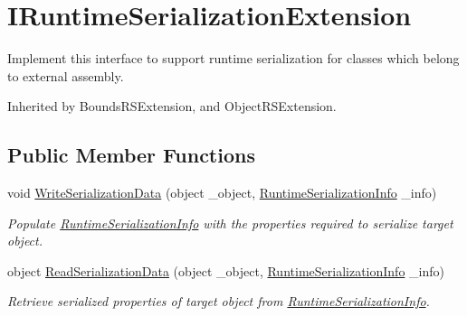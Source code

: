 \hypertarget{interface_voxel_busters_1_1_runtime_serialization_1_1_i_runtime_serialization_extension}{}\section{I\+Runtime\+Serialization\+Extension}
\label{interface_voxel_busters_1_1_runtime_serialization_1_1_i_runtime_serialization_extension}


Implement this interface to support runtime serialization for classes which belong to external assembly.  




Inherited by Bounds\+R\+S\+Extension, and Object\+R\+S\+Extension.

\subsection*{Public Member Functions}
\begin{DoxyCompactItemize}
\item 
void \hyperlink{interface_voxel_busters_1_1_runtime_serialization_1_1_i_runtime_serialization_extension_aad6284d5fa589cb9ec565d0f6a64d822}{Write\+Serialization\+Data} (object \+\_\+object, \hyperlink{class_voxel_busters_1_1_runtime_serialization_1_1_runtime_serialization_info}{Runtime\+Serialization\+Info} \+\_\+info)
\begin{DoxyCompactList}\small\item\em Populate \hyperlink{class_voxel_busters_1_1_runtime_serialization_1_1_runtime_serialization_info}{Runtime\+Serialization\+Info} with the properties required to serialize target object. \end{DoxyCompactList}\item 
object \hyperlink{interface_voxel_busters_1_1_runtime_serialization_1_1_i_runtime_serialization_extension_ad7cbc4dec1138fee757be8e783e4f323}{Read\+Serialization\+Data} (object \+\_\+object, \hyperlink{class_voxel_busters_1_1_runtime_serialization_1_1_runtime_serialization_info}{Runtime\+Serialization\+Info} \+\_\+info)
\begin{DoxyCompactList}\small\item\em Retrieve serialized properties of target object from \hyperlink{class_voxel_busters_1_1_runtime_serialization_1_1_runtime_serialization_info}{Runtime\+Serialization\+Info}. \end{DoxyCompactList}\end{DoxyCompactItemize}



